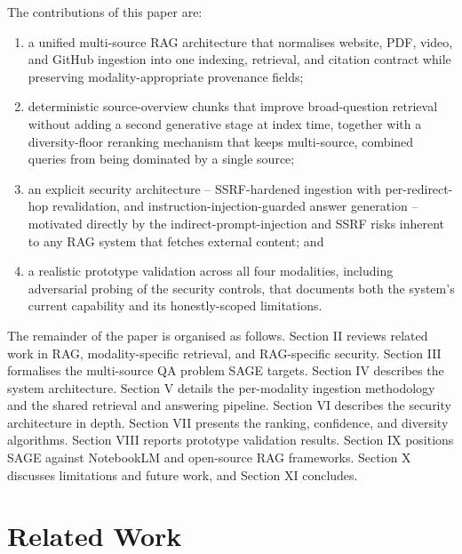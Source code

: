 \documentclass[conference]{IEEEtran}
\begin{document}
The contributions of this paper are:
\begin{enumerate}
\item a unified multi-source RAG architecture that normalises website,
PDF, video, and GitHub ingestion into one indexing, retrieval, and
citation contract while preserving modality-appropriate provenance
fields;
\item deterministic source-overview chunks that improve broad-question
retrieval without adding a second generative stage at index time,
together with a diversity-floor reranking mechanism that keeps
multi-source, combined queries from being dominated by a single source;
\item an explicit security architecture -- SSRF-hardened ingestion with
per-redirect-hop revalidation, and instruction-injection-guarded answer
generation -- motivated directly by the indirect-prompt-injection and
SSRF risks inherent to any RAG system that fetches external content; and
\item a realistic prototype validation across all four modalities,
including adversarial probing of the security controls, that documents
both the system's current capability and its honestly-scoped
limitations.
\end{enumerate}

The remainder of the paper is organised as follows. Section II reviews
related work in RAG, modality-specific retrieval, and RAG-specific
security. Section III formalises the multi-source QA problem SAGE
targets. Section IV describes the system architecture. Section V
details the per-modality ingestion methodology and the shared retrieval
and answering pipeline. Section VI describes the security architecture
in depth. Section VII presents the ranking, confidence, and diversity
algorithms. Section VIII reports prototype validation results. Section
IX positions SAGE against NotebookLM and open-source RAG frameworks.
Section X discusses limitations and future work, and Section XI
concludes.

\section{Related Work}
\end{document}
